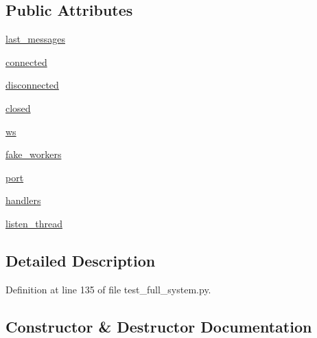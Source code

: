 \subsection*{Public Attributes}
\begin{DoxyCompactItemize}
\item 
\hyperlink{classparlai_1_1mturk_1_1core_1_1dev_1_1test_1_1test__full__system_1_1MockSocket_af4818cb8c3b13af3af1facf13279cd34}{last\+\_\+messages}
\item 
\hyperlink{classparlai_1_1mturk_1_1core_1_1dev_1_1test_1_1test__full__system_1_1MockSocket_a0037afa3da5e2ae6d361b9302f023d2d}{connected}
\item 
\hyperlink{classparlai_1_1mturk_1_1core_1_1dev_1_1test_1_1test__full__system_1_1MockSocket_a0e0c2616a26cc49ffcf1fddc321be0d9}{disconnected}
\item 
\hyperlink{classparlai_1_1mturk_1_1core_1_1dev_1_1test_1_1test__full__system_1_1MockSocket_a67852fab5c532fd3234e9d3576b902d4}{closed}
\item 
\hyperlink{classparlai_1_1mturk_1_1core_1_1dev_1_1test_1_1test__full__system_1_1MockSocket_acea3529814ac7c5c3a945af3bdc9dd18}{ws}
\item 
\hyperlink{classparlai_1_1mturk_1_1core_1_1dev_1_1test_1_1test__full__system_1_1MockSocket_a1863a94d228a5fbe463ec63dc46a5981}{fake\+\_\+workers}
\item 
\hyperlink{classparlai_1_1mturk_1_1core_1_1dev_1_1test_1_1test__full__system_1_1MockSocket_a94d66a2b377879cba3c04ffebc41656e}{port}
\item 
\hyperlink{classparlai_1_1mturk_1_1core_1_1dev_1_1test_1_1test__full__system_1_1MockSocket_a04cddff7681693b65ce05eeda7764f94}{handlers}
\item 
\hyperlink{classparlai_1_1mturk_1_1core_1_1dev_1_1test_1_1test__full__system_1_1MockSocket_a615218ba99b0538a24be27054132c6f2}{listen\+\_\+thread}
\end{DoxyCompactItemize}


\subsection{Detailed Description}


Definition at line 135 of file test\+\_\+full\+\_\+system.\+py.



\subsection{Constructor \& Destructor Documentation}
\mbox{\label{classparlai_1_1mturk_1_1core_1_1dev_1_1test_1_1test__full__system_1_1MockSocket_a6071401c1d99ecfa1627e9578caeab40}} 
